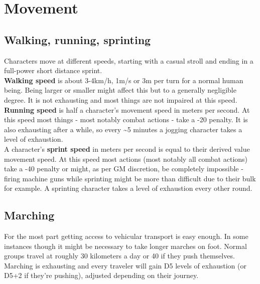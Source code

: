 \documentclass[11pt,a4paper,openany,dvipsnames]{book}
\begin{document}
	

	\chapter{Movement}
	\section{Walking, running, sprinting}
	Characters move at different speeds, starting with a casual stroll and ending in a full-power short distance sprint.\\
	\textbf{Walking speed} is about 3-4km/h, 1m/s or 3m per turn for a normal human being. Being larger or smaller might affect this but to a generally negligible degree. It is not exhausting and most things are not impaired at this speed.\\
	\textbf{Running speed} is half a character’s movement speed in meters per second.
	At this speed most things - most notably combat actions - take a -20 penalty.
	It is also exhausting after a while, so every \sim 5 minutes a jogging character takes a level of exhaustion.\\
	A character’s \textbf{sprint speed} in meters per second is equal to their derived value movement speed.
	At this speed most actions (most notably all combat actions)
		take a -40 penalty
		or might, as per GM discretion, be completely impossible
		- firing machine guns while sprinting might be more than difficult due to their bulk for example.
	A sprinting character takes a level of exhaustion every other round.
	\section{Marching}
	For the most part getting access to vehicular transport is easy enough.
	In some instances though it might be necessary to take longer marches on foot.
	Normal groups travel at roughly 30 kilometers a day or 40 if they push themselves.
	\\%
	Marching is exhausting and every traveler will gain D5 levels of exhaustion (or D5+2 if they're pushing), adjusted depending on their journey.
\end{document}
